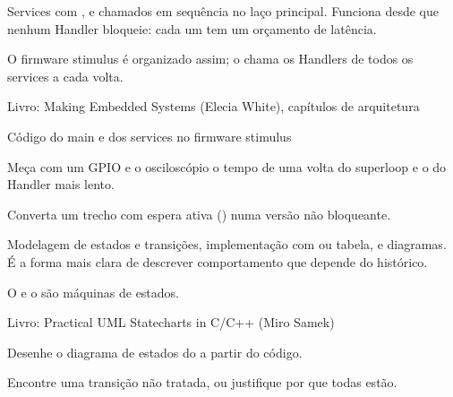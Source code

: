
Services com ,  e  chamados em sequência no laço principal. Funciona desde que nenhum Handler bloqueie: cada um tem um orçamento de latência.

\begin{noproduto}
O firmware stimulus é organizado assim; o  chama os Handlers de todos os services a cada volta.
\end{noproduto}

\begin{paraestudar}
  \item Livro: Making Embedded Systems (Elecia White), capítulos de arquitetura
  \item Código do main e dos services no firmware stimulus
\end{paraestudar}

\begin{pratique}
  \item Meça com um GPIO e o osciloscópio o tempo de uma volta do superloop e o do Handler mais lento.
  \item Converta um trecho com espera ativa () numa versão não bloqueante.
\end{pratique}

Modelagem de estados e transições, implementação com  ou tabela, e diagramas. É a forma mais clara de descrever comportamento que depende do histórico.

\begin{noproduto}
O  e o  são máquinas de estados.
\end{noproduto}

\begin{paraestudar}
  \item Livro: Practical UML Statecharts in C/C++ (Miro Samek)
  \item {}
\end{paraestudar}

\begin{pratique}
  \item Desenhe o diagrama de estados do  a partir do código.
  \item Encontre uma transição não tratada, ou justifique por que todas estão.
\end{pratique}

